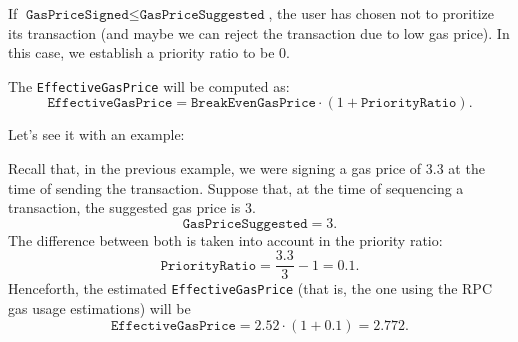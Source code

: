 If $\texttt{GasPriceSigned} \leq \texttt{GasPriceSuggested}$, the user has chosen not to proritize its transaction (and maybe we can reject the transaction due to low gas price). In this case, we establish a priority ratio to be $0$.

The \texttt{EffectiveGasPrice} will be computed as:
\[
\texttt{EffectiveGasPrice} = \texttt{BreakEvenGasPrice} \cdot (1 + \texttt{PriorityRatio}).
\]


Let's see it with an example:

Recall that, in the previous example, we were signing a gas price of $3.3$ at the time of sending the transaction. Suppose that, at the time of sequencing a transaction, the suggested gas price is 3.
\[
\texttt{GasPriceSuggested} = 3.
\]
The difference between both is taken into account in the priority ratio:
\[
\texttt{PriorityRatio} = \frac{3.3}{3} - 1 = 0.1.
\]
Henceforth, the estimated \texttt{EffectiveGasPrice} (that is, the one using the RPC gas usage estimations) will be
\[
\texttt{EffectiveGasPrice} = 2.52 \cdot (1 + 0.1) = 2.772.
\]
